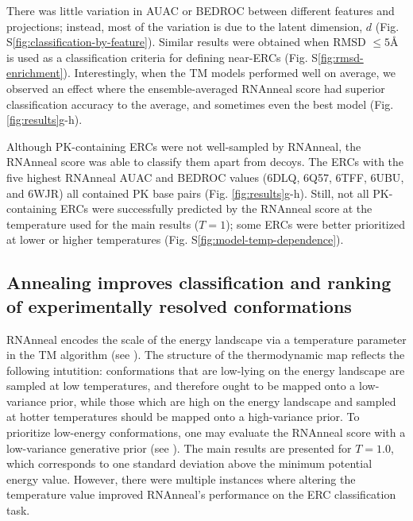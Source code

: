 \documentclass[%
aip,
 amsmath,amssymb,
reprint,%
twocolumn,
]{revtex4-1}
\begin{document}
{There was little variation in AUAC or BEDROC between different features and projections; instead, most of the variation is due to the latent dimension, $d$ (Fig. S\ref{fig:classification-by-feature}). Similar results were obtained when RMSD $\leq5${\AA} is used as a classification criteria for defining near-ERCs (Fig. S\ref{fig:rmsd-enrichment}). Interestingly, when the TM models performed well on average, we observed an effect where the ensemble-averaged RNAnneal score had superior classification accuracy to the average, and sometimes even the best model (Fig. \ref{fig:results}g-h).

Although PK-containing ERCs were not well-sampled by RNAnneal, the RNAnneal score was able to classify them apart from decoys. The ERCs with the five highest RNAnneal AUAC and BEDROC values (6DLQ\cite{Peselis2018}, 6Q57\cite{Dunstan2018}, 
6TFF\cite{Huang2020}, 6UBU\cite{Matyjasik2019}, and 6WJR\cite{Wilt2020}) all contained PK base pairs (Fig. \ref{fig:results}g-h). Still, not all PK-containing ERCs were successfully predicted by the RNAnneal score at the temperature used for the main results ($T=1$); some ERCs were better prioritized at lower or higher temperatures (Fig. S\ref{fig:model-temp-dependence}).

\subsection*{Annealing improves classification and ranking of experimentally resolved conformations}

RNAnneal encodes the scale of the energy landscape via a temperature parameter in the TM algorithm (see ). The structure of the thermodynamic map reflects the following intutition: conformations that are low-lying on the energy landscape are sampled at low temperatures, and therefore ought to be mapped onto a low-variance prior, while those which are high on the energy landscape and sampled at hotter temperatures should be mapped onto a high-variance prior. To prioritize low-energy conformations, one may evaluate the RNAnneal score with a low-variance generative prior (see ). The main results are presented for $T=1.0$, which corresponds to one standard deviation above the minimum potential energy value. However, there were multiple instances where altering the temperature value improved RNAnneal's performance on the ERC classification task.

}
\end{document}
